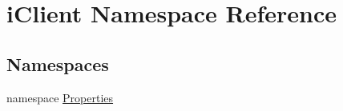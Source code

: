 \hypertarget{namespacei_client}{}\section{i\+Client Namespace Reference}
\label{namespacei_client}
\subsection*{Namespaces}
\begin{DoxyCompactItemize}
\item 
namespace \mbox{\hyperlink{namespacei_client_1_1_properties}{Properties}}
\end{DoxyCompactItemize}
